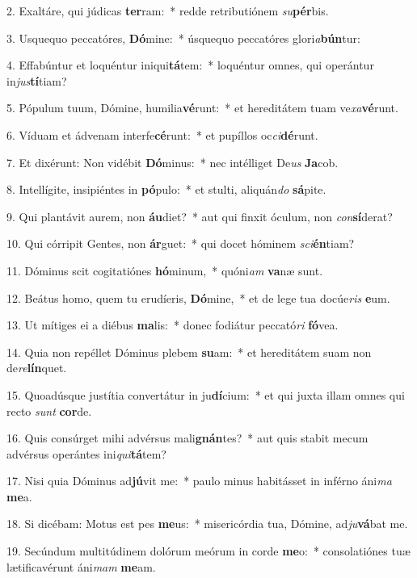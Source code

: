 2. Exaltáre, qui júdicas \textbf{ter}ram:~*  redde retributiónem \textit{su}\textbf{pér}bis.\

3. Usquequo peccatóres, \textbf{Dó}mine:~*  úsquequo peccatóres glori\textit{a}\textbf{bún}tur:\

4. Effabúntur et loquéntur iniqui\textbf{tá}tem:~*  loquéntur omnes, qui operántur in\textit{jus}\textbf{tí}tiam?\

5. Pópulum tuum, Dómine, humilia\textbf{vé}runt:~*  et hereditátem tuam ve\textit{xa}\textbf{vé}runt.\

6. Víduam et ádvenam interfe\textbf{cé}runt:~*  et pupíllos oc\textit{ci}\textbf{dé}runt.\

7. Et dixérunt: Non vidébit \textbf{Dó}minus:~*  nec intélliget De\textit{us} \textbf{Ja}cob.\

8. Intellígite, insipiéntes in \textbf{pó}pulo:~*  et stulti, aliquán\textit{do} \textbf{sá}pite.\

9. Qui plantávit aurem, non \textbf{áu}diet?~*  aut qui finxit óculum, non \textit{con}\textbf{sí}derat?\

10. Qui córripit Gentes, non \textbf{ár}guet:~*  qui docet hóminem \textit{sci}\textbf{én}tiam?\

11. Dóminus scit cogitatiónes \textbf{hó}minum,~*  quóni\textit{am} \textbf{va}næ sunt.\

12. Beátus homo, quem tu erudíeris, \textbf{Dó}mine,~*  et de lege tua docúe\textit{ris} \textbf{e}um.\

13. Ut mítiges ei a diébus \textbf{ma}lis:~*  donec fodiátur peccató\textit{ri} \textbf{fó}vea.\

14. Quia non repéllet Dóminus plebem \textbf{su}am:~*  et hereditátem suam non de\textit{re}\textbf{lín}quet.\

15. Quoadúsque justítia convertátur in ju\textbf{dí}cium:~*  et qui juxta illam omnes qui recto \textit{sunt} \textbf{cor}de.\

16. Quis consúrget mihi advérsus mali\textbf{gnán}tes?~*  aut quis stabit mecum advérsus operántes ini\textit{qui}\textbf{tá}tem?\

17. Nisi quia Dóminus ad\textbf{jú}vit me:~*  paulo minus habitásset in inférno áni\textit{ma} \textbf{me}a.\

18. Si dicébam: Motus est pes \textbf{me}us:~*  misericórdia tua, Dómine, ad\textit{ju}\textbf{vá}bat me.\

19. Secúndum multitúdinem dolórum meórum in corde \textbf{me}o:~*  consolatiónes tuæ lætificavérunt áni\textit{mam} \textbf{me}am.\

